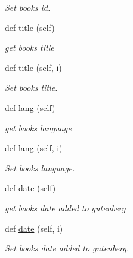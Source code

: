 \begin{DoxyCompactItemize}
\begin{DoxyCompactList}\small\item\em Set book\textquotesingle{}s id. \end{DoxyCompactList}\item 
def \hyperlink{classbridges_1_1data__src__dependent_1_1gutenberg__meta_1_1_gutenberg_meta_aeedbe713361d2deb4603ce3f8024d9d5}{title} (self)
\begin{DoxyCompactList}\small\item\em get book\textquotesingle{}s title \end{DoxyCompactList}\item 
def \hyperlink{classbridges_1_1data__src__dependent_1_1gutenberg__meta_1_1_gutenberg_meta_a9ffc7e40bf4603787cfcf754b84cae89}{title} (self, i)
\begin{DoxyCompactList}\small\item\em Set book\textquotesingle{}s title. \end{DoxyCompactList}\item 
def \hyperlink{classbridges_1_1data__src__dependent_1_1gutenberg__meta_1_1_gutenberg_meta_a79eb6a251e68b8e0093290efe06bf832}{lang} (self)
\begin{DoxyCompactList}\small\item\em get book\textquotesingle{}s language \end{DoxyCompactList}\item 
def \hyperlink{classbridges_1_1data__src__dependent_1_1gutenberg__meta_1_1_gutenberg_meta_af8a0de02d744b34bd0c1ea78e8f37d1b}{lang} (self, i)
\begin{DoxyCompactList}\small\item\em Set book\textquotesingle{}s language. \end{DoxyCompactList}\item 
def \hyperlink{classbridges_1_1data__src__dependent_1_1gutenberg__meta_1_1_gutenberg_meta_ad3b2d7bd4d505869e425ae48fafe8639}{date} (self)
\begin{DoxyCompactList}\small\item\em get book\textquotesingle{}s date added to gutenberg \end{DoxyCompactList}\item 
def \hyperlink{classbridges_1_1data__src__dependent_1_1gutenberg__meta_1_1_gutenberg_meta_a3e2308c2e88311f63800e1f7b8bffb46}{date} (self, i)
\begin{DoxyCompactList}\small\item\em Set book\textquotesingle{}s date added to gutenberg. \end{DoxyCompactList}\item 

\end{DoxyCompactItemize}
